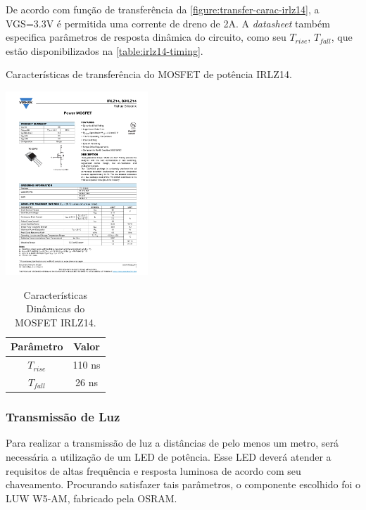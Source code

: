 	De acordo com função de transferência da \autoref{figure:transfer-carac-irlz14}, a VGS=3.3V é permitida uma corrente de dreno de 2A. A \textit{datasheet} também especifica parâmetros de resposta dinâmica do circuito, como seu $T_{rise}$, $T_{fall}$, que estão disponibilizados na \autoref{table:irlz14-timing}.
	
	\begin{chart}[h]
		\caption{\label{figure:transfer-carac-irlz14}Características de transferência do MOSFET de potência IRLZ14.}
		\centering
		\includegraphics[page=3, width=0.4\textwidth, trim={12cm 16.5cm 2.2cm 5cm}, clip]{circuits/irlz14.pdf}
	\end{chart}

	\begin{table}[h]
		\caption{Características Dinâmicas do MOSFET IRLZ14.}
		\centering
		\begin{tabular}{c c}
			\hline
			Parâmetro  & Valor  \\ \hline
			$T_{rise}$ & 110 ns \\
			$T_{fall}$ & 26 ns  \\ \hline
		\end{tabular}
		\label{table:irlz14-timing}
	\end{table}

	\subsubsection{Transmissão de Luz}
		
	Para realizar a transmissão de luz a distâncias de pelo menos um metro, será necessária a utilização de um LED de potência. Esse LED deverá atender a requisitos de altas frequência e resposta luminosa de acordo com seu chaveamento. Procurando satisfazer tais parâmetros, o componente escolhido foi o LUW W5-AM, fabricado pela OSRAM.

